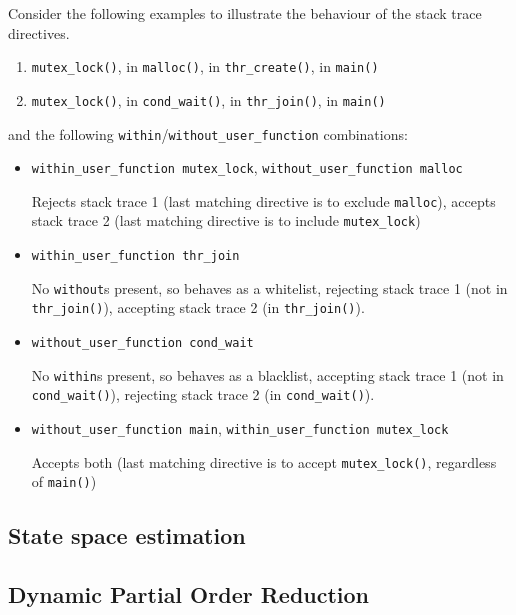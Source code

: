 Consider the following examples to illustrate the behaviour of the stack trace directives.
\begin{enumerate}
	\item
		{\tt mutex\_lock()}, in
		{\tt malloc()}, in
		{\tt thr\_create()}, in
		{\tt main()}
	\item
		{\tt mutex\_lock()}, in
		{\tt cond\_wait()}, in
		{\tt thr\_join()}, in
		{\tt main()}
\end{enumerate}
and the following {\tt within}/{\tt without\_user\_function} combinations:
\begin{itemize}
	\item
		{\tt within\_user\_function mutex\_lock},
		{\tt without\_user\_function malloc}

		Rejects stack trace 1 (last matching directive is to exclude {\tt malloc}),
		accepts stack trace 2 (last matching directive is to include {\tt mutex\_lock})
	\item
		{\tt within\_user\_function thr\_join}

		No {\tt without}s present, so behaves as a whitelist,
		rejecting stack trace 1 (not in {\tt thr\_join()}),
		accepting stack trace 2 (in {\tt thr\_join()}).
	\item
		{\tt without\_user\_function cond\_wait}

		No {\tt within}s present, so behaves as a blacklist,
		accepting stack trace 1 (not in {\tt cond\_\allowbreak{}wait()}),
		rejecting stack trace 2 (in {\tt cond\_wait()}).
	\item
		{\tt without\_user\_function main},
		{\tt within\_user\_function mutex\_lock}

		Accepts both (last matching directive is to accept {\tt mutex\_lock()},
		regardless of {\tt main()})
\end{itemize}


\subsection{State space estimation}
\label{sec:landslide-estimate}



\subsection{Dynamic Partial Order Reduction}
\label{sec:landslide-dpor}

